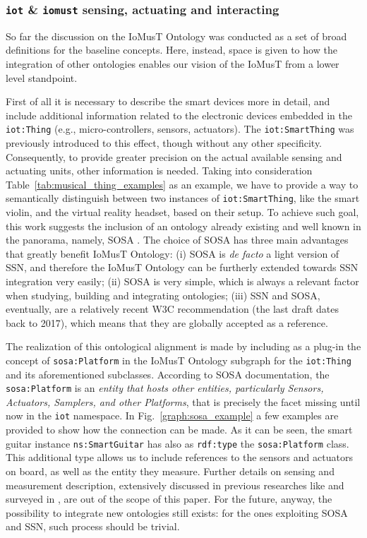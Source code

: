 \subsubsection{\textsf{\texttt{iot} \& \texttt{iomust} sensing, actuating and interacting}}
So far the discussion on the IoMusT Ontology was conducted as a set of broad definitions for the baseline concepts. Here, instead, space is given to how the integration of other ontologies enables our vision of  the IoMusT from a lower level standpoint.

First of all it is necessary to describe the smart devices more in detail, and include additional information related to the electronic devices embedded in the \texttt{iot:Thing} (e.g., micro-controllers, sensors, actuators). The \texttt{iot:SmartThing} was previously introduced to this effect, though without any other specificity. Consequently, to provide greater precision on the actual available sensing and actuating units, other information is needed. Taking into  consideration Table~\ref{tab:musical_thing_examples} as an example, we have to provide a way to semantically distinguish between two instances of \texttt{iot:SmartThing}, like the smart violin, and the virtual reality headset, based on their setup. To achieve such goal, this work suggests the inclusion of an ontology already existing and well known in the panorama, namely, SOSA . The choice of SOSA has three main advantages that greatly benefit IoMusT Ontology: (i) SOSA is \textit{de facto} a light version of SSN, and therefore the IoMusT Ontology can be furtherly extended towards SSN integration very easily; (ii) SOSA is very simple, which is always a relevant factor when studying, building and integrating ontologies; (iii) SSN and SOSA, eventually, are a relatively recent W3C recommendation (the last draft dates back to 2017), which means that they are globally accepted as a reference.

The realization of this ontological alignment is made by including as a plug-in the concept of \texttt{sosa:Platform} in the IoMusT Ontology subgraph for the \texttt{iot:Thing} and its aforementioned subclasses. According to SOSA documentation, the \texttt{sosa:Platform} is an \textit{entity that hosts other entities, particularly Sensors, Actuators, Samplers, and other Platforms}, that is precisely the facet missing until now in the \texttt{iot} namespace. In 
Fig.~\ref{graph:sosa_example}
a few examples are provided to show how the connection can be made. As it can be seen, the smart guitar instance \texttt{ns:SmartGuitar} has also as \texttt{rdf:type} the \texttt{sosa:Platform} class. This additional type allows us to include references to the sensors and actuators on board, as well as the entity they measure. Further details on sensing and measurement description, extensively discussed in previous researches like \cite{rijgersberg2013ontology, narock2009using} and surveyed in \cite{wang2015survey}, are out of the scope of this paper. For the future, anyway, the possibility to integrate new ontologies still exists: for the ones exploiting SOSA and SSN, such process should be trivial.

